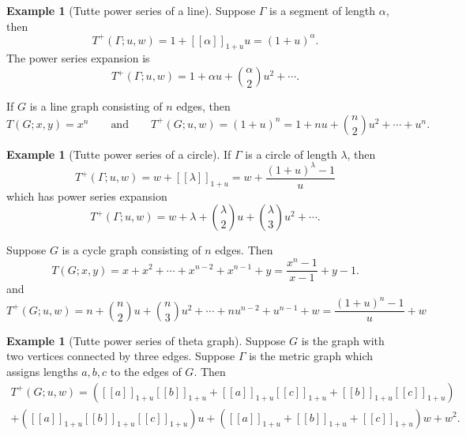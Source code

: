 \documentclass{amsart}
\theoremstyle{definition}
\newtheorem{eg}[thm]{Example}
\newcommand{\fanalog}[2]{[\![#2]\!]_{#1}}
\begin{document}
\begin{eg}[Tutte power series of a line]
Suppose $\Gamma$ is a segment of length $\alpha$,
then
\[
T^+(\Gamma;u,w) 
= 1 + \fanalog{1 + u}{\alpha} u
= (1+u)^\alpha.
\]
The power series expansion is
$$
T^+(\Gamma;u,w) 
= 1 + \alpha u + \binom{\alpha}{2}u^2 + \cdots .
$$

If $G$ is a line graph consisting of $n$ edges,
then
$$
T(G;x,y) = x^n 
\qquad\text{and}\qquad 
T^+(G;u,w) = (1+u)^n = 1 + nu + \binom{n}{2}u^2 + \cdots + u^n.
$$
\end{eg}

\begin{eg}[Tutte power series of a circle]
If $\Gamma$ is a circle of length $\lambda$, then 
\[
	T^+(\Gamma;u,w) = w + \fanalog{1 + u}{\lambda} = w + \frac{(1 + u)^\lambda - 1}{u}
\]
which has power series expansion
\[
	T^+(\Gamma;u,w) = w + \lambda + \binom{\lambda}{2} u + \binom{\lambda}{3} u^2 + \cdots .
\]

Suppose $G$ is a cycle graph consisting of $n$ edges.
Then
$$
T(G;x,y) = x + x^2 + \cdots + x^{n-2} + x^{n-1} + y 
= \frac{x^n - 1}{x - 1} + y - 1.
$$
and
$$
T^+(G;u,w) = n + \binom{n}{2}u + \binom{n}{3} u^2 + \cdots + nu^{n-2} + u^{n-1} + w
= \frac{(1+u)^n-1}{u} + w
$$
\end{eg}

\begin{eg}[Tutte power series of theta graph]
Suppose $G$ is the graph with two vertices connected by three edges.
Suppose $\Gamma$ is the metric graph which assigns lengths $a,b,c$ to the edges of $G$.
Then
\begin{multline*}
T^+(G;u,w) = ( \fanalog{1 + u}{a} \fanalog{1 + u}{b} + \fanalog{1 + u}{a} \fanalog{1 + u}{c} + \fanalog{1 + u}{b} \fanalog{1 + u}{c} ) \\
+ ( \fanalog{1 + u}{a} \fanalog{1 + u}{b} \fanalog{1 + u}{c} ) u 
+ (\fanalog{1 + u}{a} + \fanalog{1 + u}{b} + \fanalog{1 + u}{c}) w + w^2 .
\end{multline*}

\end{eg}
\end{document}
